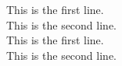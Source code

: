 \documentclass{article}
\begin{document}
This is the first line. \\
This is the second line. \\

This is the first line. \\[10pt]
This is the second line.
\end{document}
